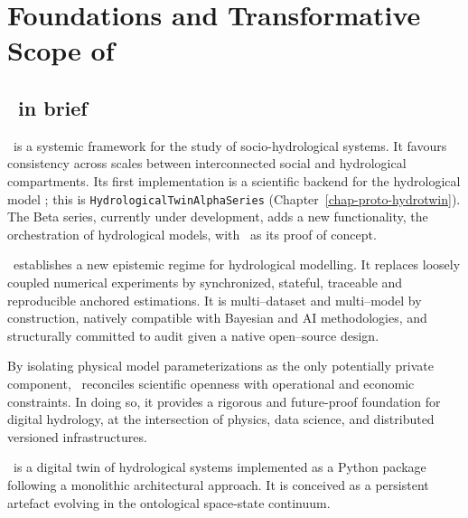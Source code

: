 \chapter{Foundations and Transformative Scope of \hydrot}

\fancyhead[LE]{\thepage} 
\fancyhead[RO]{\thepage} 
\renewcommand{\headrulewidth}{1pt}

\setlength{\parindent}{0cm} %
\setlength{\parskip}{9pt}

\htastarget




\section{\hydrot\ in brief}


\hydrot\ is a systemic framework for the study of socio-hydrological systems. It favours consistency across scales between interconnected social and hydrological compartments. Its first implementation is a scientific backend for the hydrological model \cw; this is \texttt{HydrologicalTwinAlphaSeries} (Chapter~\ref{chap-proto-hydrotwin}). The Beta series, currently under development, adds a new functionality, the orchestration of hydrological models, with \cw\ as its proof of concept.

\hydrot\ establishes a new epistemic regime for hydrological modelling. It replaces loosely coupled numerical experiments by synchronized, stateful, traceable and reproducible anchored estimations. It is multi--dataset and multi--model by construction, natively compatible with Bayesian and AI methodologies, and structurally committed to audit given a native open--source design.

By isolating physical model parameterizations as the only potentially private component, \hydrot\ reconciles scientific openness with operational and economic constraints. In doing so, it provides a rigorous and future-proof foundation for digital hydrology, at the intersection of physics, data science, and distributed versioned infrastructures.

\hydrot\ is a digital twin of hydrological systems implemented as a Python package following a monolithic architectural approach. It is conceived as a persistent artefact evolving in the ontological space-state continuum.








